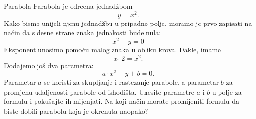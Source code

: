 \begin{surferPage}[Parabola]{Parabola}
Parabola je odre\dj ena jednad\v zbom \[y=x^2.\]
Kako bismo unijeli njenu jednad\v zbu u pripadno polje, moramo je prvo zapisati na na\v cin da s desne strane znaka jednakosti bude nula:
\[x^2-y=0\]
Eksponent unosimo pomo\' cu malog znaka u obliku krova. Dakle, imamo
\[ x  \,\hat{\ } \, 2 =x^2.\]
Dodajemo jo\v s dva parametra:
\[a \cdot x^2-y+b=0.\]
Parametar $a$ se koristi za skupljanje i rastezanje parabole, a parametar $b$ za promjenu udaljenosti parabole od ishodi\v sta.
\newline
Unesite parametre $a$ i $b$ u polje za formulu i poku\v sajte ih mijenjati. Na koji na\v cin morate promijeniti formulu da biste dobili parabolu koja je okrenuta naopako?
\end{surferPage}
